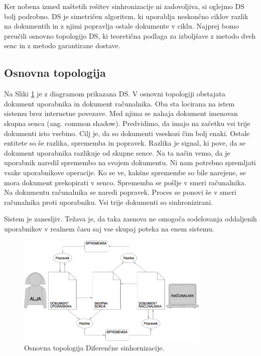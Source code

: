 \documentclass[a4paper, 12pt, twoside]{book}
\begin{document}
Ker nobena izmed naštetih rešitev sinhronizacije ni zadovoljiva, si oglejmo DS bolj podrobno. DS je simetričen algoritem, ki uporablja neskončno ciklov razlik na dokumentih in z njimi popravlja ostale dokumente v ciklu. Najprej bomo preučili osnovno topologijo DS, ki teoretična podlaga za izboljšave z metodo dveh senc in z metodo garantirane dostave.

\subsection{Osnovna topologija}

Na Sliki \ref{ds1} je z diagramom prikazana DS. V osnovni topologiji obstajata dokument uporabnika in dokument računalnika. Oba sta locirana na istem sistemu brez internetne povezave. Med njima se nahaja dokument imenovan skupna senca (ang. common shadow). Predvidimo, da imajo na začetku vsi trije dokumenti isto vsebino. Cilj je, da so dokumenti vseskozi čim bolj enaki. Ostale entitete so še razlika, sprememba in popravek. Razlika je signal, ki pove, da se dokument uporabnika razlikuje od skupne sence. Na ta način vemo, da je uporabnik naredil spremembo na svojem dokumentu. Ni nam potrebno spremljati vsake uporabnikove operacije. Ko se ve, kakšne spremembe so bile narejene, se mora dokument prekopirati v senco. Sprememba se pošlje v smeri računalnika. Na dokumentu računalnika se naredi popravek. Proces se ponovi še v smeri računalnika proti uporabniku. Vsi trije dokumenti so sinhronizirani.

Sistem je zanesljiv. Težava je, da taka zasnova ne omogoča sodelovanja oddaljenih uporabnikov v realnem času saj vse skupaj poteka na enem sistemu.

\begin{figure}[placement h]
\begin{center}
\includegraphics[width=9.2cm]{ds1.png}
\end{center}
\caption{Osnovna topologija Diferenčne sinhornizacije.}
\label{ds1}
\end{figure}
\end{document}
